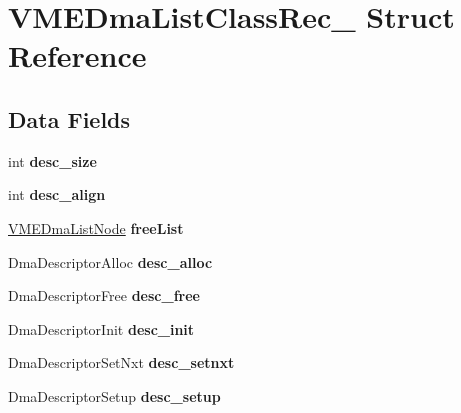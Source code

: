 \hypertarget{structVMEDmaListClassRec__}{}\section{V\+M\+E\+Dma\+List\+Class\+Rec\+\_\+ Struct Reference}
\label{structVMEDmaListClassRec__}
\subsection*{Data Fields}
\begin{DoxyCompactItemize}
\item 
\mbox{\label{structVMEDmaListClassRec___a314977c079079b07390444aac51e0108}} 
int {\bfseries desc\+\_\+size}
\item 
\mbox{\label{structVMEDmaListClassRec___a9efa06c2185dc34e6404c28451f3925d}} 
int {\bfseries desc\+\_\+align}
\item 
\mbox{\label{structVMEDmaListClassRec___a1ef2f780343dfe8599a34c813f6411a1}} 
\mbox{\hyperlink{structVMEDmaListNodeRec__}{V\+M\+E\+Dma\+List\+Node}} {\bfseries free\+List}
\item 
\mbox{\label{structVMEDmaListClassRec___a953b8f6dedf5d68aae825b63485c0ecf}} 
Dma\+Descriptor\+Alloc {\bfseries desc\+\_\+alloc}
\item 
\mbox{\label{structVMEDmaListClassRec___aa62a2a436cb2963e4744019fb33e0747}} 
Dma\+Descriptor\+Free {\bfseries desc\+\_\+free}
\item 
\mbox{\label{structVMEDmaListClassRec___a52249a1df0bdeacb0436b33f426c7322}} 
Dma\+Descriptor\+Init {\bfseries desc\+\_\+init}
\item 
\mbox{\label{structVMEDmaListClassRec___a930106d1dbafebcc95bcee61f4af55f8}} 
Dma\+Descriptor\+Set\+Nxt {\bfseries desc\+\_\+setnxt}
\item 
\mbox{\label{structVMEDmaListClassRec___aa6b58e837b6bbb25da8a21efa773e055}} 
Dma\+Descriptor\+Setup {\bfseries desc\+\_\+setup}

\end{DoxyCompactItemize}
